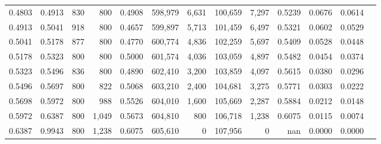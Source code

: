 \begin{tabular}{rrrrrrrrrrrrr}
0.4803 & 0.4913 &    830 &   800 &                                     0.4908 & 598,979 &   6,631 & 100,659 &   7,297 & 0.5239 & 0.0676 & 0.0614 \\
0.4913 & 0.5041 &    918 &   800 &                                     0.4657 & 599,897 &   5,713 & 101,459 &   6,497 & 0.5321 & 0.0602 & 0.0529 \\
0.5041 & 0.5178 &    877 &   800 &                                     0.4770 & 600,774 &   4,836 & 102,259 &   5,697 & 0.5409 & 0.0528 & 0.0448 \\
0.5178 & 0.5323 &    800 &   800 &                                     0.5000 & 601,574 &   4,036 & 103,059 &   4,897 & 0.5482 & 0.0454 & 0.0374 \\
0.5323 & 0.5496 &    836 &   800 &                                     0.4890 & 602,410 &   3,200 & 103,859 &   4,097 & 0.5615 & 0.0380 & 0.0296 \\
0.5496 & 0.5697 &    800 &   822 &                                     0.5068 & 603,210 &   2,400 & 104,681 &   3,275 & 0.5771 & 0.0303 & 0.0222 \\
0.5698 & 0.5972 &    800 &   988 &                                     0.5526 & 604,010 &   1,600 & 105,669 &   2,287 & 0.5884 & 0.0212 & 0.0148 \\
0.5972 & 0.6387 &    800 & 1,049 &                                     0.5673 & 604,810 &     800 & 106,718 &   1,238 & 0.6075 & 0.0115 & 0.0074 \\
0.6387 & 0.9943 &    800 & 1,238 &                                     0.6075 & 605,610 &       0 & 107,956 &       0 &    nan & 0.0000 & 0.0000 \\
\bottomrule
\end{tabular}
